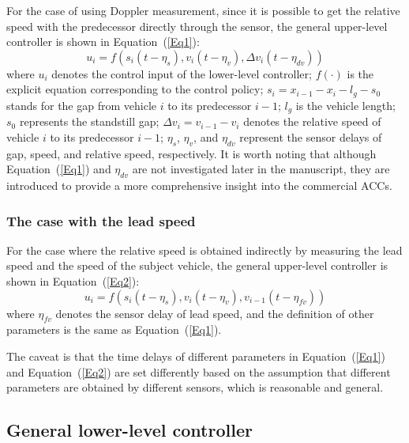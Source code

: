 \documentclass[journal]{IEEEtran}
\begin{document}
For the case of using Doppler measurement, since it is possible to get the relative speed with the predecessor directly through the sensor, the general upper-level controller is shown in Equation~(\ref{Eq1}):
\begin{equation}
  u_i=f(s_i\left(t-\eta_s\right),v_i\left(t-\eta_v\right),\Delta v_i(t-\eta_{dv}))
  \label{Eq1}
\end{equation}
where $u_i$ denotes the control input of the lower-level controller; $f(\cdot)$ is the explicit equation corresponding to the control policy; $s_i=x_{i-1}-x_i-l_g-s_0$ stands for the gap from vehicle $i$ to its predecessor $i-1$; $l_g$ is the vehicle length; $s_0$ represents the standstill gap; $\Delta v_i=v_{i-1}-v_i$ denotes the relative speed of vehicle $i$ to its predecessor $i-1$; $\eta_s$, $\eta_v$, and $\eta_{dv}$ represent the sensor delays of gap, speed, and relative speed, respectively. It is worth noting that although Equation~(\ref{Eq1}) and $\eta_{dv}$ are not investigated later in the manuscript, they are introduced to provide a more comprehensive insight into the commercial ACCs.

\subsubsection{The case with the lead speed}
\label{Section 2.2.2}

For the case where the relative speed is obtained indirectly by measuring the lead speed and the speed of the subject vehicle, the general upper-level controller is shown in Equation~(\ref{Eq2}):
\begin{equation}
  u_i=f(s_i\left(t-\eta_s\right),v_i\left(t-\eta_v\right), v_{i-1}(t-\eta_{fv}))
  \label{Eq2}
\end{equation}
where $\eta_{fv}$ denotes the sensor delay of lead speed, and the definition of other parameters is the same as Equation~(\ref{Eq1}).

The caveat is that the time delays of different parameters in Equation~(\ref{Eq1}) and Equation~(\ref{Eq2}) are set differently based on the assumption that different parameters are obtained by different sensors, which is reasonable and general.




\subsection{General lower-level controller}
\label{Section 2.3}
\end{document}
